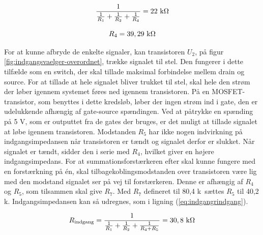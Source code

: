 \begin{equation}
\label{eq:indgangr4udregning}
\frac{1}{\frac{1}{R_1}+\frac{1}{R_2}+\frac{1}{R_4}}=22~\mathrm{k}\ohm
\end{equation}

\begin{equation}
\label{eq:indgangr4}
R_4=39,29~\mathrm{k}\ohm
\end{equation}

For at kunne afbryde de enkelte signaler, kan transistoren $U_2$, på figur \ref{fig:indgangsvaelger-overordnet}, trække signalet til stel. Den fungerer i dette tilfælde som en switch, der skal tillade maksimal forbindelse mellem drain og source. For at tillade at hele signalet bliver trukket til stel, skal hele den strøm der løber igennem systemet føres ned igennem transistoren. På en MOSFET-transistor, som benyttes i dette kredsløb, løber der ingen strøm ind i gate, den er udelukkende afhængig af gate-source spændingen. Ved at påtrykke en spænding på 5 V, som er outputtet fra de gates der bruges, er det muligt at tillade signalet at løbe igennem transistoren.
Modstanden $R_5$ har ikke nogen indvirkning på indgangsimpedansen når transistoren er tændt og signalet derfor er slukket. Når signalet er tændt, sidder den i serie med $R_4$, hvilket giver en højere indgangsimpedans. For at summationsforstærkeren efter skal kunne fungere med en forstærkning på én, skal tilbagekoblingsmodstanden over transistoren være lig med den modstand signalet ser på vej til forstærkeren. Denne er afhængig af $R_4$ og $R_5$, som tilsammen skal give $R_7$. Med $R_7$ defineret til 80,4 k\ohm~sættes $R_5$ til 40,2 k\ohm. Indgangsimpedansen kan så udregnes, som i ligning (\ref{eq:indgangrindgang}).


\begin{equation}
\label{eq:indgangrindgang}
R_{\mathrm{indgang}}=\frac{1}{\frac{1}{R_1}+\frac{1}{R_2}+\frac{1}{R_4 + R_5}}=30,8~\mathrm{k}\ohm
\end{equation}

